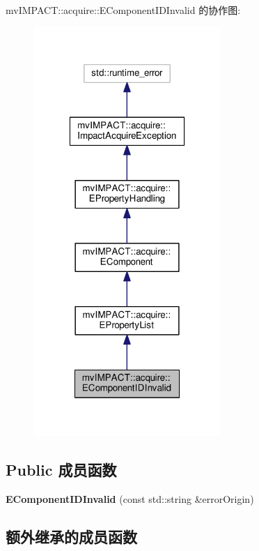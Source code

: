 mv\+I\+M\+P\+A\+C\+T\+:\+:acquire\+:\+:E\+Component\+I\+D\+Invalid 的协作图\+:
\nopagebreak
\begin{figure}[H]
\begin{center}
\leavevmode
\includegraphics[width=202pt]{classmv_i_m_p_a_c_t_1_1acquire_1_1_e_component_i_d_invalid__coll__graph}
\end{center}
\end{figure}
\subsection*{Public 成员函数}
\begin{DoxyCompactItemize}
\item 
\hypertarget{classmv_i_m_p_a_c_t_1_1acquire_1_1_e_component_i_d_invalid_aa81bb4fdf1c8ff2ab07634070bfa4a88}{{\bfseries E\+Component\+I\+D\+Invalid} (const std\+::string \&error\+Origin)}\label{classmv_i_m_p_a_c_t_1_1acquire_1_1_e_component_i_d_invalid_aa81bb4fdf1c8ff2ab07634070bfa4a88}

\end{DoxyCompactItemize}
\subsection*{额外继承的成员函数}



